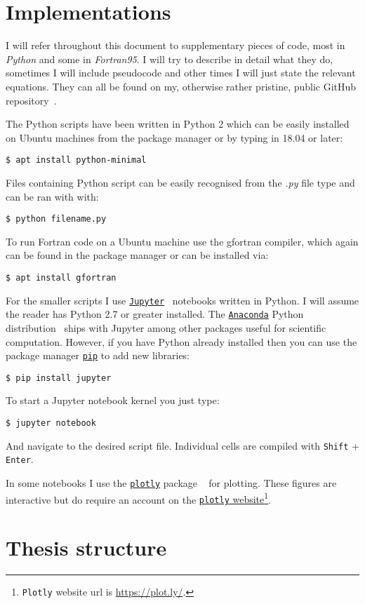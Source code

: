 \section{Implementations}

I will refer throughout this document to supplementary pieces of code, most in \emph{Python} and some in \emph{Fortran95}. I will try to describe in detail what they do, sometimes I will include pseudocode and other times I will just state the relevant equations. They can all be found on my, otherwise rather pristine, public GitHub repository~\cite{myGitHub}. 

The Python scripts have been written in Python 2 which can be easily installed on Ubuntu machines from the package manager or by typing in 18.04 or later:
\begin{verbatim}
$ apt install python-minimal
\end{verbatim}
Files containing Python script can be easily recognised from the \textit{.py} file type and can be ran with with:
\begin{verbatim}
$ python filename.py
\end{verbatim}

To run Fortran code on a Ubuntu machine use the gfortran compiler, which again can be found in the package manager or can be installed via:
\begin{verbatim}
$ apt install gfortran
\end{verbatim}

For the smaller scripts I use \href{http://jupyter.org}{\texttt{Jupyter}}~\cite{Jupyter} notebooks written in Python. I will assume the reader has Python 2.7 or greater installed. The \href{https://anaconda.org/}{\texttt{Anaconda}} Python distribution~\cite{Conda} ships with Jupyter among other packages useful for scientific computation. However, if you have Python already installed then you can use the package manager \href{https://pypi.org/project/pip/}{\texttt{pip}} to add new libraries:
\begin{verbatim}
$ pip install jupyter
\end{verbatim}
To start a Jupyter notebook kernel you just type:
\begin{verbatim}
$ jupyter notebook
\end{verbatim}
And navigate to the desired script file. Individual cells are compiled with \texttt{Shift} + \texttt{Enter}.

In some notebooks I use the \href{https://plot.ly/}{\texttt{plotly}} package ~\cite{Plotly} for plotting. These figures are interactive but do require an account on the \href{https://plot.ly/}{\texttt{plotly} website}\footnote{ \texttt{Plotly} website url is \href{https://plot.ly/}{https://plot.ly/}.}.  

\section{Thesis structure}


